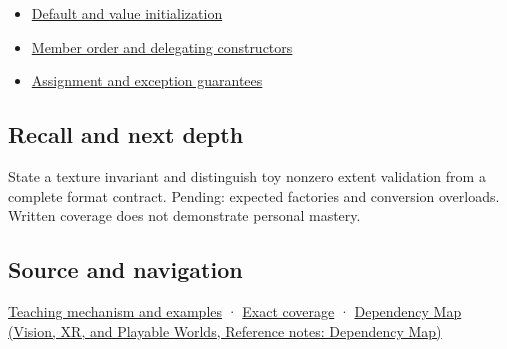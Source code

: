 \hypertarget{appendix-7f8ec83d0886-used-by}{}

\begin{itemize}
\tightlist
\item
  \hyperref[appendix-ba8c1a9fe03f]{Default and value initialization}
\item
  \hyperref[appendix-3cb49709605a]{Member order and delegating constructors}
\item
  \hyperref[appendix-bea6beb5350f]{Assignment and exception guarantees}
\end{itemize}

\subsection{Recall and next depth}\label{appendix-7f8ec83d0886-recall-and-next-depth}

\hypertarget{appendix-7f8ec83d0886-recall-and-next-depth}{}

State a texture invariant and distinguish toy nonzero extent validation from a complete format contract. Pending: expected factories and conversion overloads. Written coverage does not demonstrate personal mastery.

\subsection{Source and navigation}\label{appendix-7f8ec83d0886-source-and-navigation}

\hypertarget{appendix-7f8ec83d0886-source-and-navigation}{}

\hyperref[01-foundations-i-ch003-construction-establishes-a-usable-state]{Teaching mechanism and examples} · \hyperref[appendix-fd090d982a15-m009---parts-127-147]{Exact coverage} · \href{../07-Vision-XR-and-Playable-Worlds/main.pdf\#nameddest=appendix-4ad47bdd269a}{Dependency Map (Vision, XR, and Playable Worlds, Reference notes: Dependency Map)}
